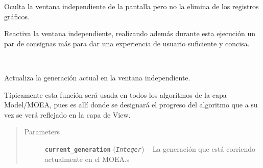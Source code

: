 \documentclass[letterpaper,10pt,english]{sphinxmanual}
\begin{document}
\begin{fulllineitems}
\begin{fulllineitems}
\end{fulllineitems}


\begin{fulllineitems}
\label{View/Additional/GenerationSignal/GenerationSignal:View.Additional.GenerationSignal.GenerationSignalToplevel.GenerationSignalToplevel.hide}
Oculta la ventana independiente de la pantalla pero no la elimina de los registros
gráficos.

\end{fulllineitems}


\begin{fulllineitems}
\label{View/Additional/GenerationSignal/GenerationSignal:View.Additional.GenerationSignal.GenerationSignalToplevel.GenerationSignalToplevel.show}
Reactiva la ventana independiente, realizando además durante esta ejecución
un par de consignas más para dar una experiencia de usuario suficiente y concisa.

\end{fulllineitems}


\begin{fulllineitems}
\label{View/Additional/GenerationSignal/GenerationSignal:View.Additional.GenerationSignal.GenerationSignalToplevel.GenerationSignalToplevel.update_current_generation}~
\begin{DUlineblock}{0em}
\item[] Actualiza la generación actual en la ventana independiente.
\item[] Típicamente esta función será usada en todos los algoritmos de la capa Model/MOEA, pues
es allí donde se designará el progreso del algoritmo que a su vez se verá 
reflejado en la capa de View.
\end{DUlineblock}
\begin{quote}\begin{description}
\item[{Parameters}] \leavevmode
\textbf{\texttt{current\_generation}} (\emph{\texttt{Integer}}) -- La generación que está corriendo actualmente en el MOEA.s


\end{description}
\end{quote}
\end{fulllineitems}
\end{fulllineitems}
\end{document}
